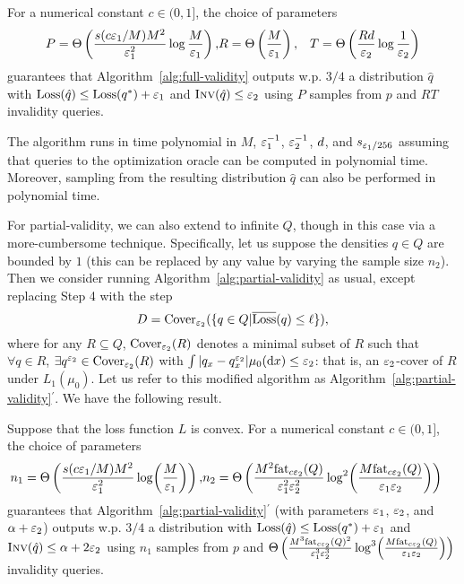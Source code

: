\begin{theorem}
\label{thm:vc-full-validity}
For a numerical constant $c \in (0,1]$, 
the choice of parameters 
\begin{eqnarray*}
P=\Theta\left(\frac{s(c \varepsilon_{1}/M) M^{2}}{\varepsilon_1^2} \log \frac{M}{\varepsilon_{1}} \right), & R = \Theta \left( \frac { M } {\varepsilon_1} \right), &  T = \Theta\left(\frac{R d}{\varepsilon_2} \log \frac{1}{\varepsilon_{2}} \right)
\end{eqnarray*}
guarantees that Algorithm~\ref{alg:full-validity} outputs w.p. $3/4$ a distribution $\hat q$ with $\text{Loss}(\hat q) \le \text{Loss}(q^*) + \varepsilon_1$ and $\textsc{Inv}(\hat q) \le \varepsilon_2$ 
using $P$ samples from $p$ and $R T$ invalidity queries.
  
The algorithm runs in time polynomial in $M$, $\varepsilon_1^{-1}$, $\varepsilon_2^{-1}$, $d$, and $s_{\varepsilon_{1}/256}$ assuming that queries to the optimization oracle 
can be computed in polynomial time. Moreover, sampling from the resulting distribution $\hat q$ can also be performed in polynomial time.
\end{theorem}

For partial-validity, we can also extend to infinite $Q$, 
though in this case via a more-cumbersome technique.
Specifically, let us suppose the densities $q \in Q$ are bounded by $1$ (this can be replaced by any value by varying the sample size $n_2$).
Then we consider running Algorithm~\ref{alg:partial-validity} as usual, 
except replacing Step 4 with the step 
\begin{equation*}
D = {\rm Cover}_{\ve_{2}}( \{ q \in Q | \overline\Loss(q) \leq \ell \} ),
\end{equation*} 
where for any $R \subseteq Q$, ${\rm Cover}_{\ve_{2}}(R)$ denotes a minimal subset of $R$ such that 
$\forall q \in R$, $\exists q^{\ve_{2}} \in {\rm Cover}_{\ve_{2}}(R)$ with $\int | q_{x} - q^{\ve_{2}}_{x} | \mu_{0}({\rm d}x) \leq \ve_{2}$:
that is, an $\varepsilon_{2}$-cover of $R$ under $L_{1}(\mu_{0})$.
Let us refer to this modified algorithm as Algorithm~\ref{alg:partial-validity}$^{\prime}$.
We have the following result. 

\begin{theorem}
\label{thm:vc-partial-validity}
Suppose that the loss function $L$ is convex.
For a numerical constant $c \in (0,1]$, 
the choice of parameters
\begin{eqnarray*}
n_1 = \Theta\left(\frac{\fat(c\ve_{1}/M) M^{2}}{\ve_1^2} \log \!\left(\frac{M}{\ve_{1}}\right)  \right), & n_2 = \Theta\left(\frac {M^2 {\rm fat}_{c\ve_{2}}(Q)} {\ve_1^2 \ve_2^2} \log^{2} \!\left(\frac{M {\rm fat}_{c\ve_{2}}(Q)}{\ve_1 \ve_2}\right)\right)
\end{eqnarray*}
guarantees that Algorithm~\ref{alg:partial-validity}$^{\prime}$ (with parameters $\varepsilon_{1}$, $\varepsilon_{2}$, and $\alpha+\varepsilon_{2}$) 
outputs w.p. $3/4$ a distribution with 
$\text{Loss}(\hat q) \le \text{Loss}(q^*) + \varepsilon_1$ and $\textsc{Inv}(\hat q) \le \alpha + 2\varepsilon_2$ using $n_{1}$ samples from $p$ and 
$\Theta\left(\frac {M^3 {\rm fat}_{c\ve_{2}}(Q)^{2}} {\ve_1^3 \ve_2^3} \log^{3} \!\left(\frac{M {\rm fat}_{c\ve_{2}}(Q)}{\ve_1 \ve_2}\right)\right)$ 
invalidity queries.
\end{theorem}

